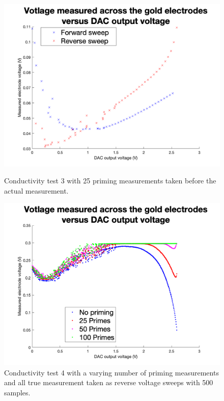\begin{figure}[ht]
    \begin{minipage}{0.5\textwidth}
        \centering
        \includegraphics[width=\textwidth]{Figures/Testing/Aus5}
        \caption{Conductivity test 3 with 25 priming measurements taken before the actual measurement.}
        \label{fig:test-test3} %
    \end{minipage}
    \begin{minipage}{0.5\textwidth}
        \centering
        \includegraphics[width=\textwidth]{Figures/Testing/Aus7}
        \caption{Conductivity test 4 with a varying number of priming measurements and all true measurement taken as reverse voltage sweeps with 500 samples.}
        \label{fig:test-test4} %
    \end{minipage}
\end{figure}


